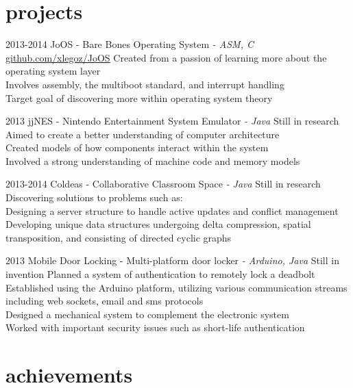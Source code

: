 \documentclass[]{friggeri-cv}
\begin{document}
\section{projects}

\begin{entrylist}
  \entry
    {2013-2014}
    {JoOS \textsf{- Bare Bones Operating System \em{- ASM, C}}}
    {\href{http://github.com/xlegoz/JoOS}{github.com/xlegoz/JoOS}}
    {Created from a passion of learning more about the operating system layer \\
    Involves assembly, the multiboot standard, and interrupt handling \\
    Target goal of discovering more within operating system theory}
    
  \entry
  	{2013}
  	{jjNES \textsf{- Nintendo Entertainment System Emulator \em{- Java}}}
  	{Still in research}
  	{Aimed to create a better understanding of computer architecture \\
  	Created models of how components interact within the system \\
  	Involved a strong understanding of machine code and memory models}
  	
  \entry
  	{2013-2014}
  	{Coldeas \textsf{- Collaborative Classroom Space \em{- Java}}}
  	{Still in research}
  	{Discovering solutions to problems such as: \\
	Designing a server structure to handle active updates and conflict management \\
  	Developing unique data structures undergoing delta compression, spatial transposition, and consisting of directed cyclic graphs}
  
  \entry
  	{2013}
  	{Mobile Door Locking \textsf{- Multi-platform door locker \em{- Arduino, Java}}}
  	{Still in invention}
  	{Planned a system of authentication to remotely lock a deadbolt \\
  	Established using the Arduino platform, utilizing various communication streams including web sockets, email and sms protocols \\
  	Designed a mechanical system to complement the electronic system \\
  	Worked with important security issues such as short-life authentication}
\end{entrylist}

\section{achievements}
\end{document}
